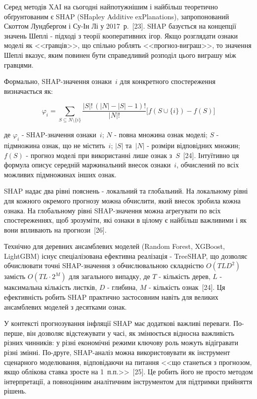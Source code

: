 \documentclass[a4paper,ukrainian,oneside]{extreport}
\begin{document}
Серед методів XAI на сьогодні найпотужнішим і найбільш теоретично обґрунтованим є SHAP (SHapley Additive exPlanations), запропонований Скоттом Лундбергом і Су-Ін Лі у 2017~р.~[23]. SHAP базується на концепції значень Шеплі - підході з теорії кооперативних ігор. Якщо розглядати ознаки моделі як <<гравців>>, що спільно роблять <<прогноз-виграш>>, то значення Шеплі вказує, яким повинен бути справедливий розподіл цього виграшу між гравцями.

Формально, SHAP-значення ознаки~$i$ для конкретного спостереження визначається як:

\begin{equation}
\varphi_i = \sum_{S\subseteq N\setminus\{i\}}
\frac{|S|!\,(|N|-|S|-1)!}{|N|!}
\bigl[f(S\cup\{i\})-f(S)\bigr]
\end{equation}

де $\varphi_i$ - SHAP-значення ознаки~$i$; $N$ - повна множина ознак моделі; $S$ - підмножина ознак, що не містить~$i$; $|S|$ та~$|N|$ - розміри відповідних множин; $f(S)$ - прогноз моделі при використанні лише ознак з~$S$~[24]. Інтуїтивно ця формула описує середній маржинальний внесок ознаки~$i$, обчислений по всіх можливих підмножинах інших ознак.

SHAP надає два рівні пояснень - локальний та глобальний. На локальному рівні для кожного окремого прогнозу можна обчислити, який внесок зробила кожна ознака. На глобальному рівні SHAP-значення можна агрегувати по всіх спостереженнях, щоб зрозуміти, які ознаки в цілому є найбільш важливими і як вони впливають на прогнози~[26].

Технічно для деревних ансамблевих моделей (Random Forest, XGBoost, LightGBM) існує спеціалізована ефективна реалізація - TreeSHAP, що дозволяє обчислювати точні SHAP-значення з обчислювальною складністю $O(TLD^2)$ замість $O(TL \cdot 2^M)$ для загального випадку, де $T$ - кількість дерев, $L$ - максимальна кількість листків, $D$ - глибина, $M$ - кількість ознак~[24]. Ця ефективність робить SHAP практично застосовним навіть для великих ансамблевих моделей з десятками ознак.

У контексті прогнозування інфляції SHAP має додаткові важливі переваги. По-перше, він дозволяє відстежувати у часі, як змінюється відносна важливість різних чинників: у різні економічні режими ключову роль можуть відігравати різні змінні. По-друге, SHAP-аналіз можна використовувати як інструмент сценарного моделювання, відповідаючи на питання <<що станеться з прогнозом, якщо облікова ставка зросте на 1~п.п.>>~[25]. Це робить його не просто методом інтерпретації, а повноцінним аналітичним інструментом для підтримки прийняття рішень.
\end{document}
